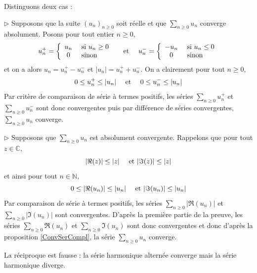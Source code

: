 \documentclass[french,11pt,twoside]{VcCours}
\newcommand{\Sum}[2]{\ensuremath{\textstyle{\sum\limits_{#1}^{#2}}}}
\begin{document}
\begin{Demonstration}{} 
Distinguons deux cas :

$\rhd$ Supposons que la suite $(u_n)_{n \geq 0}$ soit réelle et que $\Sum{n \geq 0}{} u_n$ converge absolument. Posons pour tout entier $n \geq 0$,
$$ u_n^{+} = \left\lbrace \begin{array}{cl}
u_n & \hbox{ si }  u_n \geq 0 \\
0 & \hbox{ sinon}   \\
\end{array}\right. \quad \hbox{ et } \quad u_n^{-} = \left\lbrace \begin{array}{cl}
-u_n & \hbox{ si }  u_n \leq 0 \\
0 & \hbox{ sinon}   \\
\end{array}\right.$$
et on a alors $u_n = u_n^+ -u_n^{-}$ et $\vert u_n \vert = u_n^+ + u_n^{-}$. On a clairement pour tout $n \geq 0$,
$$ 0 \leq u_n^+ \leq \vert u_n \vert \quad \hbox{ et } \quad 0 \leq u_n^{-} \leq \vert u_n \vert $$
Par critère de comparaison de série à termes positifs, les séries $\Sum{n \geq 0}{} u_n^+$ et $\Sum{n \geq 0}{} u_n^{-}$ sont donc convergentes puis par différence de séries convergentes, $\Sum{n \geq 0}{} u_n$ converge.

\medskip

$\rhd$ Supposons que $\Sum{n \geq 0}{} u_n$ est absolument convergente. Rappelons que pour tout $z \in \mathbb{C}$,
$$ \vert \Re(z) \vert \leq \vert z \vert \quad \hbox{ et }  \vert \Im(z) \vert \leq \vert z \vert$$
et ainsi pour tout $n \in \mathbb{N}$,
$$ 0 \leq \vert \Re(u_n) \vert \leq \vert u_n \vert \quad \hbox{ et }  \vert \Im(u_n) \vert \leq \vert u_n \vert$$
Par comparaison de série à termes positifs, les séries $\Sum{n \geq 0}{} \vert \Re(u_n) \vert$ et $\Sum{n \geq 0}{} \vert \Im(u_n) \vert$ sont convergentes. D'après la première partie de la preuve, les séries $\Sum{n \geq 0}{}  \Re(u_n) $ et $\Sum{n \geq 0}{}  \Im(u_n) $ sont donc convergentes et donc d'après la proposition \ref{ConvSerCompl}, la série $\Sum{n \geq 0}{} u_n$ converge.
\newpage

\vspace*{5cm}

\end{Demonstration}

\begin{Remarque}{} La réciproque est fausse : la série harmonique alternée converge mais la série harmonique diverge.
\end{Remarque}
\end{document}
